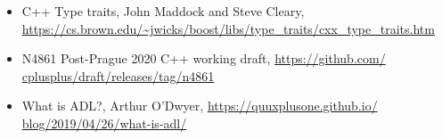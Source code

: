 \begin{itemize}
\item
C++ Type traits, John Maddock and Steve Cleary, \url{https://cs.brown.edu/~jwicks/boost/libs/type_traits/cxx_type_traits.htm}

\item
N4861 Post-Prague 2020 C++ working draft, \url{https://github.com/ cplusplus/draft/releases/tag/n4861}

\item
What is ADL?, Arthur O’Dwyer, \url{https://quuxplusone.github.io/ blog/2019/04/26/what-is-adl/}

\end{itemize}